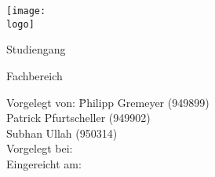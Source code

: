 \begin{titlepage}

\begin{minipage}{\textwidth}
		\noindent \hfill \texttt{[image: \\logo]}
\end{minipage}
\vspace{6em}

\begin{center}
    {\huge \art}
    
    {\Large Studiengang \studiengang}
    
    \vspace{4em}
    
    \textbf{{\Large \titel}}
    
    \vspace{4em}
    
    \hochschule
    
    \hochschulezusatz

    Fachbereich \fachbereich
    
    \vspace{6em}

	\begin{minipage}{\textwidth}
		\begin{tabbing}
		
		Vorgelegt von:  \hspace*{2em}\= Philipp Gremeyer (949899) \\%
        \> Patrick Pfurtscheller (949902) \\
        \> Subhan Ullah (950314) \\
        Vorgelegt bei: \> \betreuer \\
        Eingereicht am: \> \datumAbgabe
		\end{tabbing}

	\end{minipage}
\end{center}
\end{titlepage}
